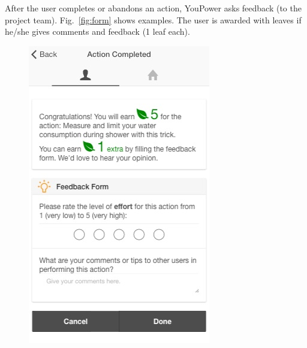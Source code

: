 \documentclass[a4paper,10pt]{article}
\begin{document}
After the user completes or abandons an action, YouPower asks feedback (to the project team). Fig.~\ref{fig:form} shows examples. The user is awarded with leaves if he/she gives comments and feedback (1 leaf each). 

\begin{figure}[t!]
      \begin{center}
        \begin{minipage}[t!]{0.3\linewidth}
	       \includegraphics[width=1\linewidth]{img/action_completed.jpg}
           \vspace{1.95cm}
        \end{minipage}

\end{center}
\end{figure}
\end{document}

